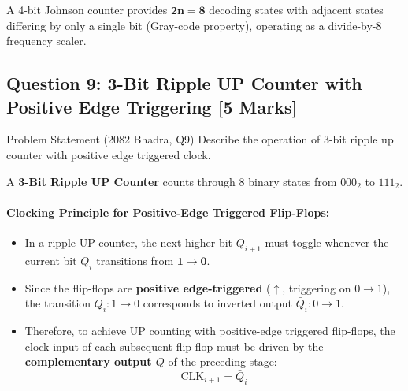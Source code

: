 \documentclass[11pt,a4paper,oneside]{book}
\begin{document}
\begin{answerbox}
A 4-bit Johnson counter provides $\mathbf{2n = 8}$ decoding states with adjacent states differing by only a single bit (Gray-code property), operating as a divide-by-8 frequency scaler.
\end{answerbox}

\vspace{0.6cm}

\subsection{Question 9: 3-Bit Ripple UP Counter with Positive Edge Triggering [5 Marks]}
\begin{questionbox}{Problem Statement (2082 Bhadra, Q9)}
Describe the operation of 3-bit ripple up counter with positive edge triggered clock.
\end{questionbox}

A \textbf{3-Bit Ripple UP Counter} counts through 8 binary states from $000_2$ to $111_2$. 

\paragraph{Clocking Principle for Positive-Edge Triggered Flip-Flops:}
\begin{itemize}
  \item In a ripple UP counter, the next higher bit $Q_{i+1}$ must toggle whenever the current bit $Q_i$ transitions from $\mathbf{1 \to 0}$.
  \item Since the flip-flops are \textbf{positive edge-triggered} ($\uparrow$, triggering on $0 \to 1$), the transition $Q_i: 1 \to 0$ corresponds to inverted output $\bar{Q}_i: 0 \to 1$.
  \item Therefore, to achieve UP counting with positive-edge triggered flip-flops, the clock input of each subsequent flip-flop must be driven by the \textbf{complementary output $\bar{Q}$} of the preceding stage:
  \[
  \text{CLK}_{i+1} = \bar{Q}_i
  \]
\end{itemize}
\end{document}
